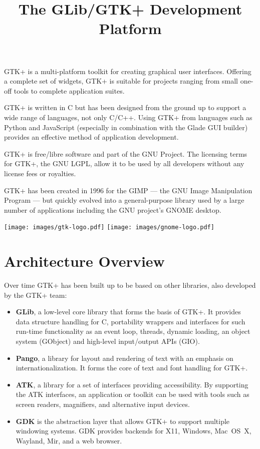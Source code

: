 \documentclass[a4paper,notumble]{leaflet}
\title{The GLib/GTK+ Development Platform}
\date{}
\author{}
\begin{document}
\maketitle
\thispagestyle{empty}

GTK+ is a multi-platform toolkit for creating graphical user interfaces. Offering a complete set of widgets, GTK+ is suitable for projects ranging from small one-off tools to complete application suites.

GTK+ is written in C but has been designed from the ground up to support a wide range of languages, not only C/C++. Using GTK+ from languages such as Python and JavaScript (especially in combination with the Glade GUI builder) provides an effective method of application development.

GTK+ is free/libre software and part of the GNU Project. The licensing terms for GTK+, the GNU LGPL, allow it to be used by all developers without any license fees or royalties.

GTK+ has been created in 1996 for the GIMP --- the GNU Image Manipulation Program --- but quickly evolved into a general-purpose library used by a large number of applications including the GNU project's GNOME desktop.

\begin{center}
  \texttt{[image: images/gtk-logo.pdf]}
  \hspace{1cm}
  \texttt{[image: images/gnome-logo.pdf]}
\end{center}

\pagebreak

\section{Architecture Overview}

Over time GTK+ has been built up to be based on other libraries, also developed by the GTK+ team:
\begin{itemize}
  \item \textbf{GLib}, a low-level core library that forms the basis of GTK+. It provides data structure handling for C, portability wrappers and interfaces for such run-time functionality as an event loop, threads, dynamic loading, an object system (GObject) and high-level input/output APIs (GIO).

  \item \textbf{Pango}, a library for layout and rendering of text with an emphasis on internationalization. It forms the core of text and font handling for GTK+.

  \item \textbf{ATK}, a library for a set of interfaces providing accessibility. By supporting the ATK interfaces, an application or toolkit can be used with tools such as screen readers, magnifiers, and alternative input devices.

  \item \textbf{GDK} is the abstraction layer that allows GTK+ to support multiple windowing systems. GDK provides backends for X11, Windows, Mac~OS~X, Wayland, Mir, and a web browser.
\end{itemize}
\end{document}
